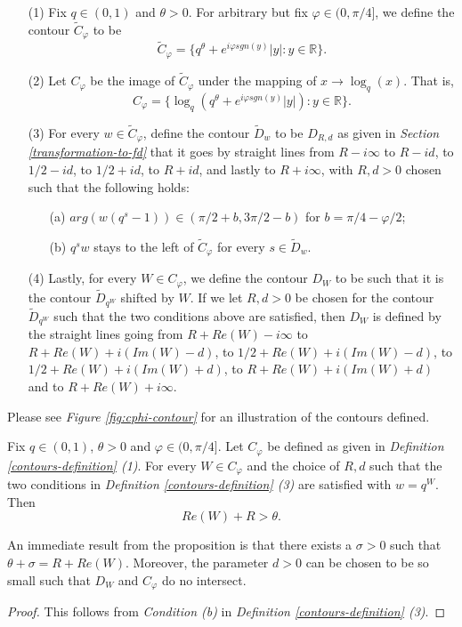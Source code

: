 \begin{definition}
\label{contours-definition}
\begin{enumerate}
\item[(1)] Fix $q \in (0,1)$ and $\theta > 0$. For arbitrary but fix $\varphi \in (0, \pi / 4]$, we define the contour $\tilde{C}_{\varphi}$ to be $$\tilde{C}_{\varphi} = \{q^{\theta} + e^{i\varphi sgn(y)} |y|: y \in \mathbb{R}\}.$$ 
\item[(2)] Let $C_{\varphi}$ be the image of $\tilde{C}_{\varphi}$ under the mapping of $x \rightarrow \log_q(x)$. That is, $$C_{\varphi} = \{\log_q (q^{\theta} + e^{i\varphi sgn(y)} |y|) : y \in \mathbb{R}\}.$$
\item[(3)] For every $w \in \tilde{C}_{\varphi}$, define the contour $\tilde{D}_{w}$ to be $D_{R,d}$ as given in \textit{Section \ref{transformation-to-fd}} that it goes by straight lines from $R - i\infty$ to $R - id$, to $1/2 - id$, to $1/2 + id$, to $R + id$, and lastly to $R+i\infty$, with $R, d>0$ chosen such that the following holds:
\begin{enumerate}
\item[(a)] $arg(w(q^s-1)) \in (\pi / 2+b, 3\pi / 2 - b)$ for $b = \pi / 4 - \varphi / 2$;
\item[(b)] $q^sw$ stays to the left of $\tilde{C}_{\varphi}$ for every $s \in \tilde{D}_{w}$.
\end{enumerate}
\item[(4)] Lastly, for every $W \in C_{\varphi}$, we define the contour $D_W$ to be such that it is the contour $\tilde{D}_{q^W}$ shifted by $W$. If we let $R,d > 0$ be chosen for the contour $\tilde{D}_{q^W}$ such that the two conditions above are satisfied, then $D_W$ is defined by the straight lines going from $R+Re(W)-i \infty$ to $R+Re(W) + i(Im(W) - d)$, to $1/2+Re(W) + i(Im(W) - d)$, to $1/2 + Re(W) + i(Im(W) + d)$, to $R+Re(W) + i(Im(W) + d)$ and to $R+Re(W) + i \infty$.
\end{enumerate}

Please see \textit{Figure \ref{fig:cphi-contour}} for an illustration of the contours defined.
\end{definition}

\begin{proposition}
Fix $q \in (0,1)$, $\theta > 0$ and $\varphi \in (0, \pi / 4]$. Let $C_{\varphi}$ be defined as given in \textit{Definition \ref{contours-definition} (1)}. For every $W \in C_{\varphi}$ and the choice of $R, d$ such that the two conditions in \textit{Definition \ref{contours-definition} (3)} are satisfied with $w = q^W$. Then $$Re(W) + R > \theta.$$
\end{proposition}
\begin{remark}
An immediate result from the proposition is that there exists a $\sigma > 0$ such that $\theta + \sigma = R + Re(W)$. Moreover, the parameter $d > 0$ can be chosen to be so small such that $D_W$ and $C_{\varphi}$ do no intersect.
\end{remark}
\begin{proof}
This follows from \textit{Condition (b)} in \textit{Definition \ref{contours-definition} (3)}.
\end{proof}

